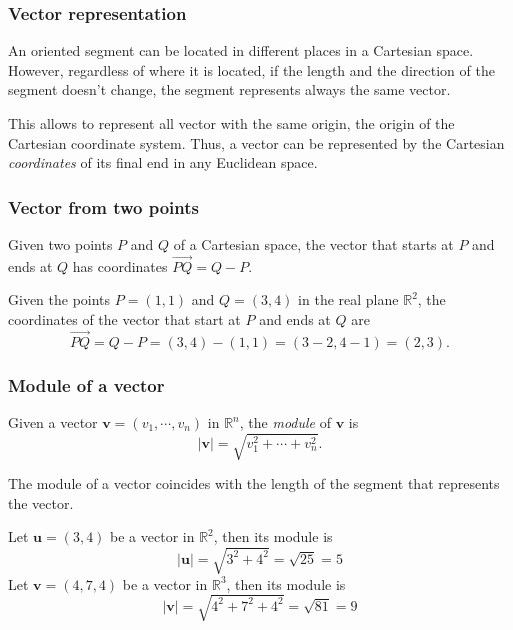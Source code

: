 \begin{frame}
\frametitle{Vector representation}
An oriented segment can be located in different places in a Cartesian space.  
However, regardless of where it is located, if the length and the direction of the segment doesn't change, the segment represents always the same vector. 

This allows to represent all vector with the same origin, the origin of the Cartesian coordinate system.
Thus, a vector can be represented by the Cartesian \emph{coordinates} of its final end in any Euclidean space.

\begin{center}

\end{center}
\end{frame}


\begin{frame}
\frametitle{Vector from two points}
Given two points $P$ and $Q$ of a Cartesian space, the vector that starts at $P$ and ends at $Q$ has coordinates 
$\vec{PQ}=Q-P$.

 Given the points $P=(1,1)$ and $Q=(3,4)$ in the real plane $\mathbb{R}^2$, the coordinates of the vector that start at $P$ and ends at $Q$ are
\[
\vec{PQ} = Q-P = (3,4)-(1,1) = (3-2,4-1) = (2,3).
\]
\begin{center}

\end{center}
\end{frame}


\begin{frame}
\frametitle{Module of a vector}
\begin{definition}
Given a vector $\mathbf{v}=(v_1,\cdots,v_n)$ in $\mathbb{R}^n$, the \emph{module} of $\mathbf{v}$ is
\[
|\mathbf{v}| = \sqrt{v_1^2+ \cdots + v_n^2}.
\]
\end{definition}
The module of a vector coincides with the length of the segment that represents the vector.

Let $\mathbf{u}=(3,4)$ be a vector in $\mathbb{R}^2$, then its module is
\[
|\mathbf{u}| = \sqrt{3^2+4^2} = \sqrt{25} = 5
\]
Let $\mathbf{v}=(4,7,4)$ be a vector in $\mathbb{R}^3$, then its module is
\[
|\mathbf{v}| = \sqrt{4^2+7^2+4^2} = \sqrt{81} = 9
\]
\end{frame}


